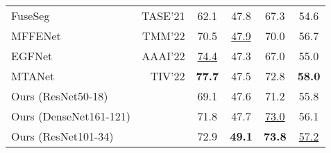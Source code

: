 \documentclass[10.5pt,twocolumn,journal,letterpaper]{IEEEtran}
\begin{document}
\begin{table}[!t]
{\begin{tabular}{l r c c c c}
		FuseSeg\cite{sun-tase2021-fuseseg} & TASE'21 & 62.1 & 47.8 & 67.3 & 54.6 \\
		\rowcolor{maroon}MFFENet\cite{zhou-tmm2021-mffenet} & TMM'22 & 70.5 & \underline{47.9} & 70.0 & 56.7 \\
		EGFNet\cite{zhou-aaai2022-egfnet} & AAAI'22 & \underline{74.4} & 47.3 & 67.0 & 55.0 \\
		\rowcolor{maroon}MTANet\cite{zhou-tiv2022-mtanet} & TIV'22 & \textbf{77.7} & 47.5 & 72.8 & \textbf{58.0} \\
		\midrule[0.5pt]
		Ours (ResNet50-18) & & 69.1 & 47.6 & 71.2 & 55.8\\
		\rowcolor{maroon}Ours (DenseNet161-121) & & 71.8 & 47.7 & \underline{73.0} & 56.1 \\
		Ours (ResNet101-34) & & 72.9 & \textbf{49.1} & \textbf{73.8} & \underline{57.2} \\
		\toprule[0.75pt]
	\end{tabular}
}
\end{table}
\end{document}
